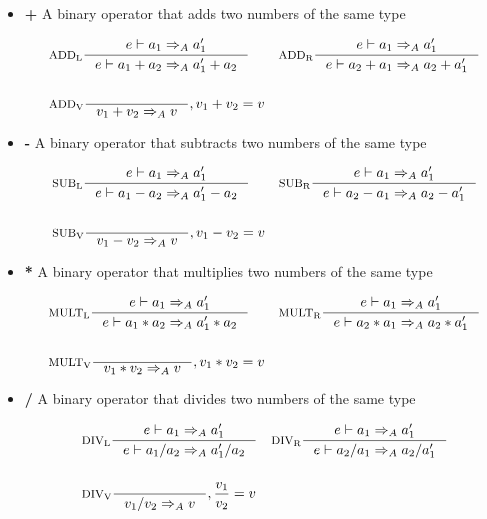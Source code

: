 \begin{itemize}
\item \textbf{+} A binary operator that adds two numbers of the same type

\begin{align*}
&\inference[$\text{ADD}_\text{L}$]{e \vdash a_1 \Rightarrow_A a_1'}
                    {e \vdash  a_1 + a_2 \Rightarrow_A a_1' + a_2}
&
&\inference[$\text{ADD}_\text{R}$]{e \vdash a_1 \Rightarrow_A a_1'}
                    {e \vdash a_2 + a_1 \Rightarrow_A a_2 + a_1'}
\\\\
&\inference[$\text{ADD}_\text{V}$]{}
                    {v_1 + v_2 \Rightarrow_A v}
                    {, v_1 + v_2 = v}
\end{align*}

\item \textbf{-} A binary operator that subtracts two numbers of the same type

\begin{align*}
&\inference[$\text{SUB}_\text{L}$]{e \vdash a_1 \Rightarrow_A a_1'}
                    {e \vdash a_1 - a_2 \Rightarrow_A a_1' - a_2}
&
&\inference[$\text{SUB}_\text{R}$]{e \vdash a_1 \Rightarrow_A a_1'}
                    {e \vdash a_2 - a_1 \Rightarrow_A a_2 - a_1'}
\\\\
&\inference[$\text{SUB}_\text{V}$]{}
                    {v_1 - v_2 \Rightarrow_A v}
                    {, v_1 - v_2 = v}
\end{align*}

\item \textbf{*} A binary operator that multiplies two numbers of the same type

\begin{align*}
&\inference[$\text{MULT}_\text{L}$]{e \vdash a_1 \Rightarrow_A a_1'}
                     {e \vdash a_1 * a_2 \Rightarrow_A a_1' * a_2}
&
&\inference[$\text{MULT}_\text{R}$]{e \vdash a_1 \Rightarrow_A a_1'}
                     {e \vdash a_2 * a_1 \Rightarrow_A a_2 * a_1'}
\\\\
&\inference[$\text{MULT}_\text{V}$]{}
                     {v_1 * v_2 \Rightarrow_A v}
                     {, v_1 * v_2 = v}
\end{align*}

\item \textbf{/} A binary operator that divides two numbers of the same type

\begin{align*}
&\inference[$\text{DIV}_\text{L}$]{e \vdash a_1 \Rightarrow_A a_1'}
                    {e \vdash a_1 / a_2 \Rightarrow_A a_1' / a_2}
&
&\inference[$\text{DIV}_\text{R}$]{e \vdash a_1 \Rightarrow_A a_1'}
                    {e \vdash a_2 / a_1 \Rightarrow_A a_2 / a_1'}
\\\\
&\inference[$\text{DIV}_\text{V}$]{}
                    {v_1 / v_2 \Rightarrow_A v}
                    {, \frac{v_1}{v_2} = v}
\end{align*}


\end{itemize}

